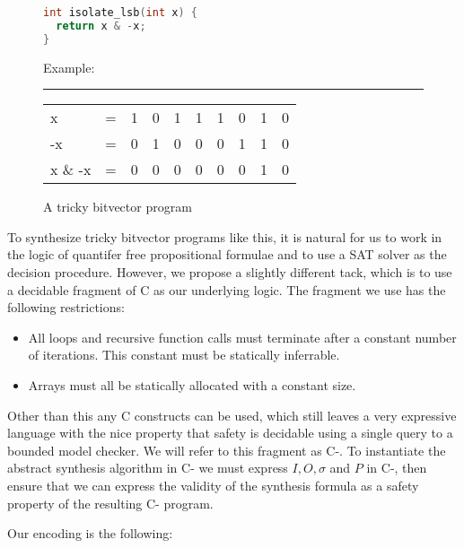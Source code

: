 \documentclass[a4paper]{llncs}
\begin{document}
\begin{figure}
\centering
\begin{minipage}{0.45\linewidth}
 \begin{lstlisting}[language=C]
int isolate_lsb(int x) {
  return x & -x;
}
 \end{lstlisting}
\end{minipage}
\begin{minipage}{0.45\linewidth}
 
Example:

\hrule

\begin{tabular}{llcccccccc}
 x       & = & 1 & 0 & 1 & 1 & 1 & 0 & 1 & 0 \\
 -x      & = & 0 & 1 & 0 & 0 & 0 & 1 & 1 & 0 \\
 x \& -x & = & 0 & 0 & 0 & 0 & 0 & 0 & 1 & 0
\end{tabular}
\end{minipage}

 \label{fig:bitvector-program}
 \caption{A tricky bitvector program}
\end{figure}

To synthesize tricky bitvector programs like this, it is natural for us to work
in the logic of quantifer free propositional formulae and to use a SAT solver as
the decision procedure.  However, we propose a slightly different tack, which is
to use a decidable fragment of C as our underlying logic.  The fragment we use
has the following restrictions:

\begin{itemize}
 \item All loops and recursive function calls must terminate after a constant number
 of iterations.  This constant must be statically inferrable.
 \item Arrays must all be statically allocated with a constant size.
\end{itemize}

Other than this any C constructs can be used, which still leaves a very expressive
language with the nice property that safety is decidable using a single query to a
bounded model checker.  We will refer to this fragment as C-.  To instantiate the
abstract synthesis algorithm in C- we must express $I, O, \sigma$ and $P$ in C-,
then ensure that we can express the validity of the synthesis formula as a safety
property of the resulting C- program.

Our encoding is the following:
\end{document}
